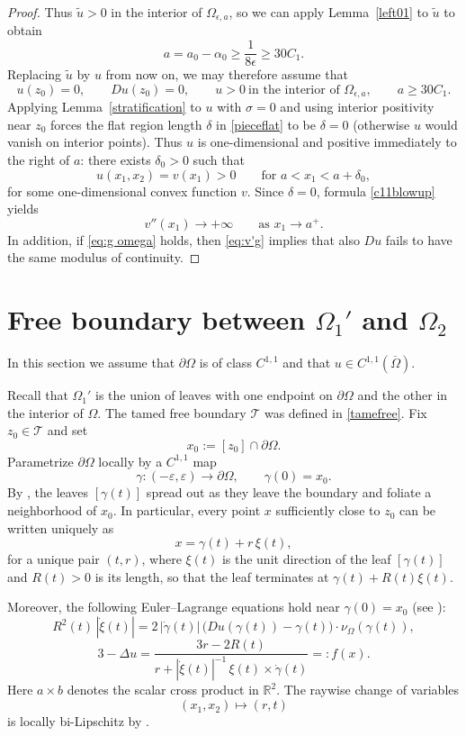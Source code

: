 \documentclass[reqno,11pt]{amsart}
\numberwithin{equation}{section}
\theoremstyle{remark}
\begin{document}
\begin{proof}
Thus \(\tilde u>0\) in the interior of \(\Omega_{\epsilon,a}\), so we can apply Lemma~\ref{left01} to \(\tilde u\) to obtain
\[
a=a_0-\alpha_0\ge \frac{1}{8\epsilon}\ge 30C_1.
\]
Replacing \(\tilde u\) by \(u\) from now on, we may therefore assume that
\[
u(z_0)=0,\qquad Du(z_0)=0,\qquad u>0 \ \text{in the interior of } \Omega_{\epsilon,a},
\qquad a\ge 30C_1.
\]
Applying Lemma~\ref{stratification} to $u$ with $\sigma=0$ and using interior positivity near $z_0$ forces the flat
region length $\delta$ in \eqref{pieceflat} to be $\delta=0$ (otherwise $u$ would vanish on interior points).
Thus $u$ is one-dimensional and positive immediately to the right of $a$:
there exists $\delta_0>0$ such that
\[
u(x_1,x_2)=v(x_1)>0\qquad\text{for }a<x_1<a+\delta_0,
\]
for some one-dimensional convex function $v$.
Since $\delta=0$, formula \eqref{c11blowup} yields
\[
v''(x_1)\to+\infty
\qquad\text{as }x_1\to a^+.
\]
In addition, if \eqref{eq:g omega} holds,
then \eqref{eq:v'g} implies that also $Du$ fails to have the same modulus of continuity. 
\end{proof}



\section{Free boundary between $\Omega_1'$ and $\Omega_2$}\label{sec4}

In this section we assume that $\partial \Omega$ is of class $C^{1,1}$ and that $u \in C^{1,1}(\overline\Omega)$.


Recall that $\Omega_1'$ is the union of leaves with one endpoint on $\partial\Omega$
and the other in the interior of $\Omega$. The tamed free boundary $\mathcal{T}$ was
defined in \eqref{tamefree}. Fix $z_0\in\mathcal{T}$ and set
\[
x_0:=[z_0]\cap\partial\Omega.
\]
Parametrize $\partial\Omega$ locally by a $C^{1,1}$ map
\[
\gamma\colon (-\varepsilon,\varepsilon)\to \partial\Omega,
\qquad
\gamma(0)=x_0.
\]
By \cite[Lemma~6.1 and Remark~6.4]{MRZ20252}, the leaves $[\gamma(t)]$ spread out as they
leave the boundary and foliate a neighborhood of $x_0$. In particular, every point $x$
sufficiently close to $z_0$ can be written uniquely as
\[
x=\gamma(t)+r\,\xi(t),
\]
for a unique pair $(t,r)$, where $\xi(t)$ is the unit direction of the leaf $[\gamma(t)]$ and
$R(t)>0$ is its length, so that the leaf terminates at $\gamma(t)+R(t)\xi(t)$.

Moreover, the following Euler--Lagrange equations hold near $\gamma(0)=x_0$
(see \cite{MRZ20252}):
\begin{equation}\label{EL r}
R^2(t)\,|\dot\xi(t)|
=
2\,|\dot\gamma(t)|\,
\bigl(Du(\gamma(t))-\gamma(t)\bigr)\cdot \nu_{\Omega}(\gamma(t)),
\end{equation}
\begin{equation}\label{EL u}
3-\Delta u
=
\frac{3r-2R(t)}
{r+|\dot\xi(t)|^{-1}\,\xi(t)\times\dot\gamma(t)}
=:f(x).
\end{equation}
Here $a\times b$ denotes the scalar cross product in $\mathbb R^2$.
The raywise change of variables
\[
(x_1,x_2)\mapsto (r,t)
\]
is locally bi-Lipschitz by \cite[Lemma~6.3 and Corollary~6.6]{MRZ20252}.
\end{document}
